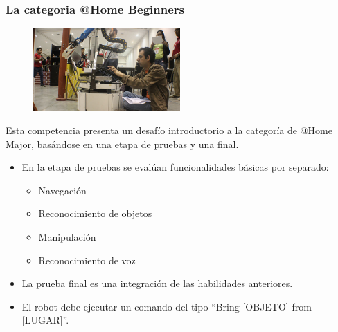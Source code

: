 \documentclass[10pt,spanish,aspectratio=1610]{beamer}
\begin{document}
\begin{frame}\frametitle{La categoria @Home Beginners}
  \begin{figure}
    \centering
    \includegraphics[width=0.5\textwidth]{Figures/AtHomeBeginners.jpg}
  \end{figure}

  Esta competencia presenta un desafío introductorio a la categoría de @Home Major, basándose en una etapa de pruebas y una final.
      \begin{itemize}
      \item En la etapa de pruebas se evalúan funcionalidades básicas por separado:
        \begin{itemize}
        \item Navegación
        \item Reconocimiento de objetos
        \item Manipulación
        \item Reconocimiento de voz
        \end{itemize}
      \item La prueba final es una integración de las habilidades anteriores.
      \item El robot debe ejecutar un comando del tipo ``Bring [OBJETO] from [LUGAR]''.
      \end{itemize}
\end{frame}
\end{document}
